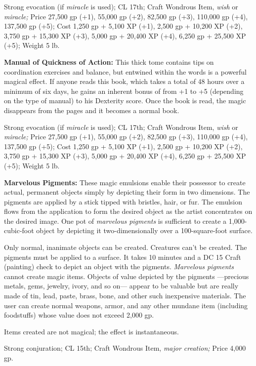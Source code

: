 \documentclass{article}
\begin{document}
Strong evocation (if \textit{miracle }is used); CL 17th; Craft Wondrous Item, \textit{wish 
}or \textit{miracle; }Price 27,500 gp (+1), 55,000 gp (+2), 82,500 gp (+3), 110,000 
gp (+4), 137,500 gp (+5); Cost 1,250 gp + 5,100 XP (+1), 2,500 gp + 10,200 XP (+2), 
3,750 gp + 15,300 XP (+3), 5,000 gp + 20,400 XP (+4), 6,250 gp + 25,500 XP (+5); 
Weight 5 lb.

\textbf{Manual of Quickness of Action:} This thick tome contains tips on coordination 
exercises and balance, but entwined within the words is a powerful magical effect. 
If anyone reads this book, which takes a total of 48 hours over a minimum of six 
days, he gains an inherent bonus of from +1 to +5 (depending on the type of manual) 
to his Dexterity score. Once the book is read, the magic disappears from the pages 
and it becomes a normal book.

Strong evocation (if \textit{miracle }is used); CL 17th; Craft Wondrous Item, \textit{wish 
}or \textit{miracle; }Price 27,500 gp (+1), 55,000 gp (+2), 82,500 gp (+3), 110,000 
gp (+4), 137,500 gp (+5); Cost 1,250 gp + 5,100 XP (+1), 2,500 gp + 10,200 XP (+2), 
3,750 gp + 15,300 XP (+3), 5,000 gp + 20,400 XP (+4), 6,250 gp + 25,500 XP (+5); 
Weight 5 lb.

\textbf{Marvelous Pigments:} These magic emulsions enable their possessor to create 
actual, permanent objects simply by depicting their form in two dimensions. The 
pigments are applied by a stick tipped with bristles, hair, or fur. The emulsion 
flows from the application to form the desired object as the artist concentrates 
on the desired image. One pot of \textit{marvelous pigments }is sufficient to create 
a 1,000-cubic-foot object by depicting it two-dimensionally over a 100-square-foot 
surface. 

Only normal, inanimate objects can be created. Creatures can't be created. The 
pigments must be applied to a surface. It takes 10 minutes and a DC 15 Craft (painting) 
check to depict an object with the pigments. \textit{Marvelous pigments }cannot 
create magic items. Objects of value depicted by the pigments ---precious metals, 
gems, jewelry, ivory, and so on--- appear to be valuable but are really made of 
tin, lead, paste, brass, bone, and other such inexpensive materials. The user can 
create normal weapons, armor, and any other mundane item (including foodstuffs) 
whose value does not exceed 2,000 gp.

Items created are not magical; the effect is instantaneous.

Strong conjuration; CL 15th; Craft Wondrous Item, \textit{major creation; }Price 
4,000 gp.
\end{document}
